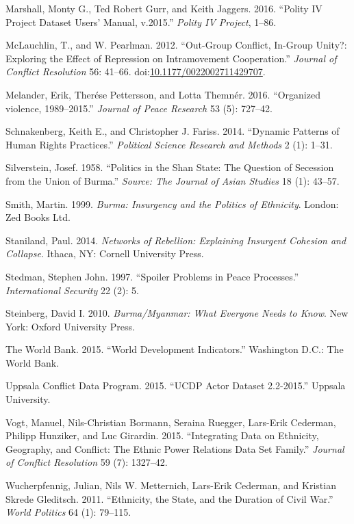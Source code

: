 \documentclass[12pt,]{book}
\theoremstyle{definition}
\theoremstyle{definition}
\theoremstyle{remark}
\begin{document}
\hypertarget{ref-Marshall2016}{}
Marshall, Monty G., Ted Robert Gurr, and Keith Jaggers. 2016. ``Polity
IV Project Dataset Users' Manual, v.2015.'' \emph{Polity IV Project},
1--86.

\hypertarget{ref-McLauchlin2012}{}
McLauchlin, T., and W. Pearlman. 2012. ``Out-Group Conflict, In-Group
Unity?: Exploring the Effect of Repression on Intramovement
Cooperation.'' \emph{Journal of Conflict Resolution} 56: 41--66.
doi:\href{https://doi.org/10.1177/0022002711429707}{10.1177/0022002711429707}.

\hypertarget{ref-Melander2016}{}
Melander, Erik, Therése Pettersson, and Lotta Themnér. 2016. ``Organized
violence, 1989--2015.'' \emph{Journal of Peace Research} 53 (5):
727--42.

\hypertarget{ref-Schnakenberg2014}{}
Schnakenberg, Keith E., and Christopher J. Fariss. 2014. ``Dynamic
Patterns of Human Rights Practices.'' \emph{Political Science Research
and Methods} 2 (1): 1--31.

\hypertarget{ref-Silverstein1958}{}
Silverstein, Josef. 1958. ``Politics in the Shan State: The Question of
Secession from the Union of Burma.'' \emph{Source: The Journal of Asian
Studies} 18 (1): 43--57.

\hypertarget{ref-Smith1999}{}
Smith, Martin. 1999. \emph{Burma: Insurgency and the Politics of
Ethnicity}. London: Zed Books Ltd.

\hypertarget{ref-Staniland2014}{}
Staniland, Paul. 2014. \emph{Networks of Rebellion: Explaining Insurgent
Cohesion and Collapse}. Ithaca, NY: Cornell University Press.

\hypertarget{ref-Stedman1997}{}
Stedman, Stephen John. 1997. ``Spoiler Problems in Peace Processes.''
\emph{International Security} 22 (2): 5.

\hypertarget{ref-Steinberg2010}{}
Steinberg, David I. 2010. \emph{Burma/Myanmar: What Everyone Needs to
Know}. New York: Oxford University Press.

\hypertarget{ref-WorldBank2015}{}
The World Bank. 2015. ``World Development Indicators.'' Washington D.C.:
The World Bank.

\hypertarget{ref-ucdpactor}{}
Uppsala Conflict Data Program. 2015. ``UCDP Actor Dataset 2.2-2015.''
Uppsala University.

\hypertarget{ref-Vogt2015}{}
Vogt, Manuel, Nils-Christian Bormann, Seraina Ruegger, Lars-Erik
Cederman, Philipp Hunziker, and Luc Girardin. 2015. ``Integrating Data
on Ethnicity, Geography, and Conflict: The Ethnic Power Relations Data
Set Family.'' \emph{Journal of Conflict Resolution} 59 (7): 1327--42.

\hypertarget{ref-Wucherpfennig2011}{}
Wucherpfennig, Julian, Nils W. Metternich, Lars-Erik Cederman, and
Kristian Skrede Gleditsch. 2011. ``Ethnicity, the State, and the
Duration of Civil War.'' \emph{World Politics} 64 (1): 79--115.
\end{document}
